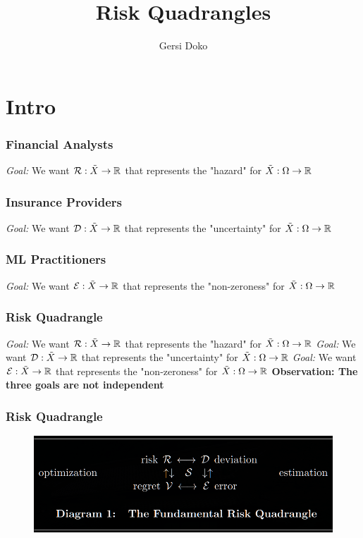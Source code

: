 \documentclass{beamer}
\title{Risk Quadrangles}
\author{Gersi Doko}
\institute{Department of Computer Science \\ University of New Hampshire}
\date{}
\begin{document}
\frame{\titlepage}

\section*{Intro}

\begin{frame}
\frametitle{Financial Analysts}
  \vfill
  \emph{Goal: }We want $\mathcal{R} : \tilde{X} \to \mathbb{R}$ that represents the "hazard" for $\tilde{X} : \Omega \to \mathbb{R}$
  \vfill
\end{frame}

\begin{frame}
\frametitle{Insurance Providers}
  \vfill
  \emph{Goal: }We want $\mathcal{D} : \tilde{X} \to \mathbb{R}$ that represents the "uncertainty" for $\tilde{X} : \Omega \to \mathbb{R}$
  \vfill
\end{frame}

\begin{frame}
\frametitle{ML Practitioners}
  \vfill
  \emph{Goal: }We want $\mathcal{E} : \tilde{X} \to \mathbb{R}$ that represents the "non-zeroness" for $\tilde{X} : \Omega \to \mathbb{R}$
  \vfill
\end{frame}

\begin{frame}
\frametitle{Risk Quadrangle}
  \vfill
  \emph{Goal: }We want $\mathcal{R} : \tilde{X} \to \mathbb{R}$ that represents the "hazard" for $\tilde{X} : \Omega \to \mathbb{R}$
  \vfill
  \emph{Goal: }We want $\mathcal{D} : \tilde{X} \to \mathbb{R}$ that represents the "uncertainty" for $\tilde{X} : \Omega \to \mathbb{R}$
  \vfill
  \emph{Goal: }We want $\mathcal{E} : \tilde{X} \to \mathbb{R}$ that represents the "non-zeroness" for $\tilde{X} : \Omega \to \mathbb{R}$
  \vfill
  \textbf{Observation:  The three goals are not independent}
\end{frame}

\begin{frame}
	\frametitle{Risk Quadrangle}
  \vfill
  \begin{figure}[ht]
    \centering
    \includegraphics[width=\textwidth]{./imgs/risk_quadrangle.png}
  \end{figure}
  \vfill
\end{frame}
\end{document}

